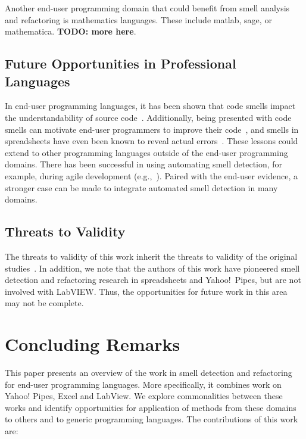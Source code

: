 \documentclass[10pt,conference,compsocconf]{IEEEtran}
\newcommand{\todo}[1]{\textbf{TODO: #1}}
\begin{document}
Another end-user programming domain that could benefit from smell analysis and refactoring is mathematics languages. These include matlab, sage, or mathematica. \todo{more here}.  


\subsection{Future Opportunities in Professional Languages}
In end-user programming languages, it has been shown that code smells impact the understandability of
source code~\cite{StoleeTSE2013}. Additionally, being presented with code smells can motivate end-user programmers to improve their code~\cite{chambers2013smell}, and smells in spreadsheets have even been known to reveal actual errors~\cite{Hermans2012intra}. These lessons could extend to other programming languages outside of the end-user programming domains. There has been successful in using automating smell detection, for example, during agile development (e.g.,~\cite{Schumacher:2010:BES:1852786.1852797}). Paired with the end-user evidence, a stronger case can be made to integrate automated smell detection in many domains. 


\subsection{Threats to Validity}
The threats to validity of this work inherit the threats to validity of the original studies~\cite{Stolee2015, Stolee2011, StoleeTSE2013, Hermans2011, Hermans2012intra, Hermans2012inter, hermans2014bumblebee, chambers2013smell, chambers2015impact, badame2012refactoring}. In addition, we note that the authors of this work have pioneered smell detection and refactoring research in spreadsheets and Yahoo!\ Pipes, but are not involved with LabVIEW. Thus, the opportunities for future work in this area may not be complete.  

\section{Concluding Remarks}
\label{sec:conclusions}
This paper presents an overview of the work in smell detection and refactoring for end-user programming languages. More specifically, it combines work on Yahoo! Pipes, Excel and LabView. We explore commonalities between these works and identify opportunities for application of methods from these domains to others and to generic programming languages. The contributions of this work are:
\end{document}
